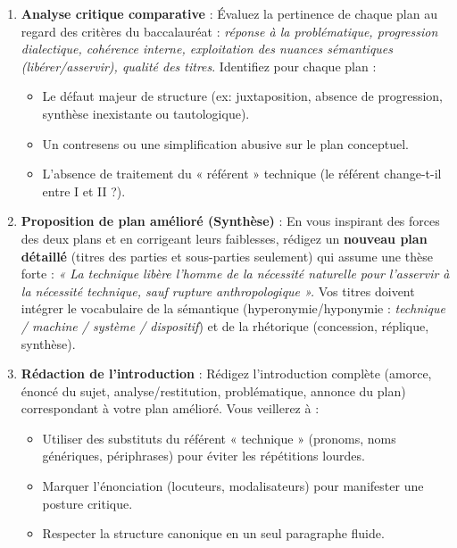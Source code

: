 \documentclass[11pt]{article}
\begin{document}
\begin{exercice}
\begin{enumerate}
    \item \textbf{Analyse critique comparative} : Évaluez la pertinence de chaque plan au regard des critères du baccalauréat : \textit{réponse à la problématique, progression dialectique, cohérence interne, exploitation des nuances sémantiques (libérer/asservir), qualité des titres}. Identifiez pour chaque plan : 
    \begin{itemize}
        \item Le défaut majeur de structure (ex: juxtaposition, absence de progression, synthèse inexistante ou tautologique).
        \item Un contresens ou une simplification abusive sur le plan conceptuel.
        \item L'absence de traitement du « référent » technique (le référent change-t-il entre I et II ?).
    \end{itemize}
    \item \textbf{Proposition de plan amélioré (Synthèse)} : En vous inspirant des forces des deux plans et en corrigeant leurs faiblesses, rédigez un \textbf{nouveau plan détaillé} (titres des parties et sous-parties seulement) qui assume une thèse forte : \textit{« La technique libère l'homme de la nécessité naturelle pour l'asservir à la nécessité technique, sauf rupture anthropologique ».} Vos titres doivent intégrer le vocabulaire de la sémantique (hyperonymie/hyponymie : \textit{technique / machine / système / dispositif}) et de la rhétorique (concession, réplique, synthèse).
    \item \textbf{Rédaction de l'introduction} : Rédigez l'introduction complète (amorce, énoncé du sujet, analyse/restitution, problématique, annonce du plan) correspondant à votre plan amélioré. Vous veillerez à :
    \begin{itemize}
        \item Utiliser des substituts du référent « technique » (pronoms, noms génériques, périphrases) pour éviter les répétitions lourdes.
        \item Marquer l'énonciation (locuteurs, modalisateurs) pour manifester une posture critique.
        \item Respecter la structure canonique en un seul paragraphe fluide.
    \end{itemize}
\end{enumerate}
\end{exercice}
\end{document}
